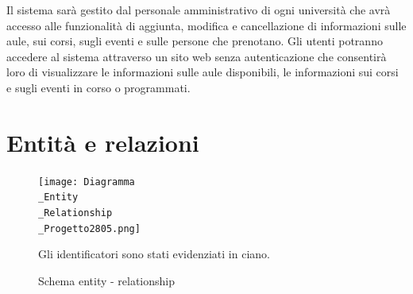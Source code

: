 \documentclass[a4paper, 10pt, oneside]{article} %
\begin{document}
Il sistema sarà gestito dal personale amministrativo di ogni università che avrà accesso alle funzionalità di aggiunta, modifica e cancellazione di informazioni sulle aule, sui corsi, sugli eventi e sulle persone che prenotano. Gli utenti potranno accedere al sistema attraverso un sito web senza autenticazione che consentirà loro di visualizzare le informazioni sulle aule disponibili, le informazioni sui corsi e sugli eventi in corso o programmati.


\section{Entità e relazioni}

\begin{figure}[h]
  \centering
\texttt{[image: Diagramma\\\_Entity\\\_Relationship\\\_Progetto2805.png]}
  \caption{Schema entity - relationship}
  Gli identificatori sono stati evidenziati in ciano.\\
\end{figure}

\newpage
\end{document}
